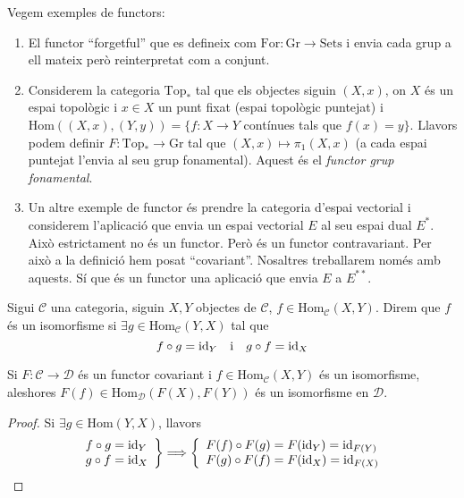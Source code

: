 \documentclass[../main.tex]{subfiles}
\begin{document}
\begin{ej}
Vegem exemples de functors:
\begin{enumerate}
    \item El functor ``forgetful'' que es defineix com $\mathrm{For}:\mathrm{Gr}\rightarrow \mathrm{Sets}$ i envia cada grup a ell mateix però reinterpretat com a conjunt.
    \item Considerem la categoria $\mathrm{Top}_*$ tal que els objectes siguin $(X,x)$, on $X$ és un espai topològic i $x\in X$ un punt fixat (espai topològic puntejat) i $\mathrm{Hom}((X,x),(Y,y)) = \{f:X\rightarrow Y$ contínues tals que $f(x) = y\}$. Llavors podem definir $F:\mathrm{Top}_*\rightarrow\mathrm{Gr}$ tal que $(X,x)\mapsto \pi_1(X,x)$ (a cada espai puntejat l'envia al seu grup fonamental). Aquest és el \textit{functor grup fonamental}.
    \item Un altre exemple de functor és prendre la categoria d'espai vectorial i considerem l'aplicació que envia un espai vectorial $E$ al seu espai dual $E^*$. Això estrictament no és un functor. Però és un functor contravariant. Per això a la definició hem posat ``covariant''. Nosaltres treballarem només amb aquests. Sí que és un functor una aplicació que envia $E$ a $E^{**}$.
\end{enumerate}
\end{ej}


\begin{defi}[Isomorfisme]
 Sigui $\mathcal{C}$ una categoria, siguin $X,Y$ objectes de $\mathcal{C}$, $f\in\mathrm{Hom}_{\mathcal{C}}(X,Y)$. Direm que $f$ és un isomorfisme si $\exists g\in \mathrm{Hom}_{\mathcal{C}}(Y,X)$ tal que
\begin{equation}
    \notag
    f\circ g = \mathrm{id}_Y\quad\text{i}\quad g\circ f = \mathrm{id}_X
\end{equation}
\end{defi}

\begin{prop}
\label{prop:isomorfismes} Si $F:\mathcal{C}\rightarrow\mathcal{D}$ és un functor covariant i $f\in\mathrm{Hom}_{\mathcal{C}}(X,Y)$ és un isomorfisme, aleshores $F(f)\in\mathrm{Hom}_{\mathcal{D}}(F(X),F(Y))$ és un isomorfisme en $\mathcal{D}$.
\end{prop}
\begin{proof}
Si $\exists g\in\mathrm{Hom}(Y,X)$, llavors
\begin{equation}
    \notag
    \left.
    \begin{array}{ll}
        f\circ g = \mathrm{id}_Y\\
        g\circ f = \mathrm{id}_X
    \end{array}
    \right\}\Longrightarrow \left\{
    \begin{array}{ll}
        F(f)\circ F(g) = F(\mathrm{id}_Y)= \mathrm{id}_{F(Y)}\\
        F(g)\circ F(f) = F(\mathrm{id}_X) = \mathrm{id}_{F(X)}
    \end{array}
    \right.
\end{equation}
\end{proof}
\end{document}
